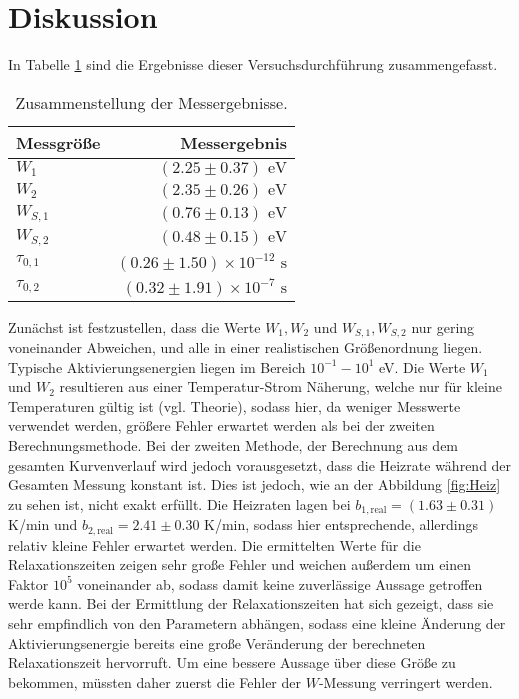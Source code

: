 

\section{Diskussion}
In Tabelle \ref{tab:Diskussion} sind die Ergebnisse dieser Versuchsdurchführung
zusammengefasst.

\begin{table}[h]
\centering
\begin{tabular}{lr}
\toprule \midrule
Messgröße & Messergebnis\\
\midrule

$W_1$ &$ (2.25 \pm 0.37) \text{ eV}$ \\

$W_2 $& $(2.35\pm 0.26) \text{ eV}$ \\

$W_{S,1}$ &$ (0.76\pm 0.13) \text{ eV}$ \\

$W_{S,2}$ &$ (0.48\pm 0.15) \text{ eV}$ \\

$\tau_{0,1}$ & $(0.26 \pm 1.50) \times 10^{-12}\text{ s}$ \\

$\tau_{0,2} $& $(0.32 \pm 1.91) \times 10^{-7}\text{ s} $\\
\midrule \bottomrule
\end{tabular}
\caption{Zusammenstellung der Messergebnisse.}
\label{tab:Diskussion}
\end{table}

Zunächst ist festzustellen, dass die Werte $W_1,W_2$ und $W_{S,1},W_{S,2}$ nur gering voneinander 
Abweichen, und alle in einer realistischen Größenordnung liegen. Typische Aktivierungsenergien 
liegen im Bereich $10^{-1}-10^1$ eV. Die Werte $W_1$ und $W_2$ resultieren aus einer 
Temperatur-Strom Näherung, welche nur für kleine Temperaturen gültig ist (vgl. Theorie), sodass 
hier, da weniger Messwerte verwendet werden, größere Fehler erwartet werden als bei der 
zweiten Berechnungsmethode. Bei der zweiten Methode, der Berechnung aus dem gesamten 
Kurvenverlauf wird jedoch vorausgesetzt, dass die Heizrate während der Gesamten Messung konstant 
ist. Dies ist jedoch, wie an der Abbildung \ref{fig:Heiz} zu sehen ist, nicht exakt erfüllt. 
Die Heizraten lagen bei $b_{1,\text{real}}=(1.63\pm 0.31)$ K/min und $b_{2,\text{real}}=2.41\pm 
0.30$ K/min, sodass hier entsprechende, allerdings relativ kleine Fehler erwartet werden. Die 
ermittelten Werte für die Relaxationszeiten zeigen sehr große Fehler und weichen außerdem 
um einen Faktor $10^5$ voneinander ab, sodass damit keine zuverlässige Aussage getroffen 
werde kann. Bei der Ermittlung der Relaxationszeiten hat sich gezeigt, dass sie sehr 
empfindlich von den Parametern abhängen, sodass eine kleine Änderung der Aktivierungsenergie 
bereits eine große Veränderung der berechneten Relaxationszeit hervorruft. Um eine bessere 
Aussage über diese Größe zu bekommen, müssten daher zuerst die Fehler der $W$-Messung verringert 
werden.